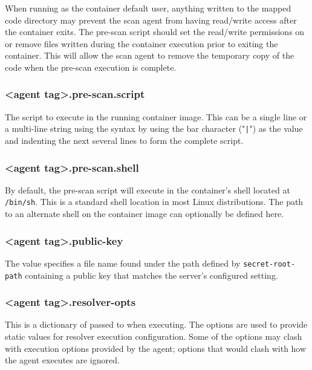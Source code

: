 When running as the container default user, anything written to the mapped code directory may prevent the scan
agent from having read/write access after the container exits.  The pre-scan script should set the read/write
permissions on or remove files written during the container execution prior to exiting the container.  This will
allow the scan agent to remove the temporary copy of the code when the pre-scan execution is complete.


\subsubsection{<agent tag>.pre-scan.script}\label{sec:agent-pre-scan-script}
The script to execute in the running container image.  This can be a single line or a multi-line
string using the  syntax
by using the bar character ("\texttt{|}") as the value and indenting the next several lines to form the
complete script.


\subsubsection{<agent tag>.pre-scan.shell}\label{sec:agent-pre-scan-shell}
By default, the pre-scan script will execute in the container's shell located at \texttt{/bin/sh}.  This is a standard shell location
in most Linux distributions.  The path to an alternate shell on the container image can optionally be defined here.

\subsubsection{<agent tag>.public-key}\label{sec:agent-public-key}
The value specifies a file name found under the path defined by \texttt{secret-root-path} containing a 
public key that matches the server's configured  setting.


\subsubsection{<agent tag>.resolver-opts}\label{sec:agent-resolver-opts}
This is a dictionary of
passed to \scaresolver when executing.  The options are used to provide static values for resolver execution configuration.  Some of the
options may clash with execution options provided by the agent; options that would clash with how the agent executes \scaresolver are ignored.  

